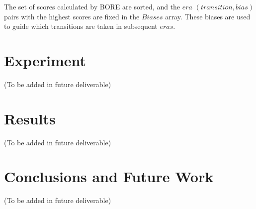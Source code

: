 \documentclass{sig-alternate}
\begin{document}
The set of scores calculated by BORE are sorted, and the $era$ $(transition,bias)$ 
pairs with the highest scores are fixed in the $Biases$ array. These biases are
used to guide which transitions are taken in subsequent $eras$. 

\section{Experiment}

(To be added in future deliverable)

\section{Results}

(To be added in future deliverable)

\section{Conclusions and Future Work}

(To be added in future deliverable)



\end{document}
